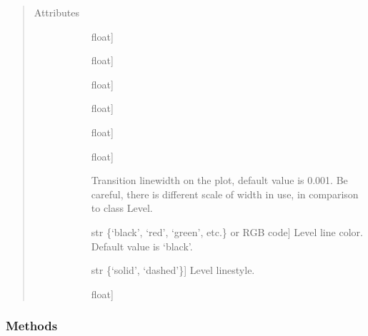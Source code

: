\documentclass[letterpaper,10pt,english]{sphinxmanual}
\begin{document}
\begin{fulllineitems}
\begin{quote}
\begin{description}
\item[{Attributes}] \leavevmode\begin{description}
\item[{}] \leavevmode{[}float{]}
\item[{}] \leavevmode{[}float{]}
\item[{}] \leavevmode{[}float{]}
\item[{}] \leavevmode{[}float{]}
\item[{}] \leavevmode{[}float{]}
\item[{}] \leavevmode{[}float{]}
\item[{}] \leavevmode
Transition linewidth on the plot, default value is 0.001. Be careful, there is different scale of width in use, in comparison to class Level.

\item[{}] \leavevmode{[}str \{‘black’, ‘red’, ‘green’, etc.\} or RGB code{]}
Level line color. Default value is ‘black’.

\item[{}] \leavevmode{[}str \{‘solid’, ‘dashed’\}{]}
Level linestyle.

\item[{}] \leavevmode{[}float{]}
\end{description}

\end{description}\end{quote}
\subsubsection*{Methods}


\begin{savenotes}\sphinxatlongtablestart\begin{longtable}{}
\hline

\endfirsthead

%
{}\\
\hline

\endhead

\hline
{}\\
\endfoot


\end{longtable}
\end{savenotes}
\end{fulllineitems}
\end{document}
